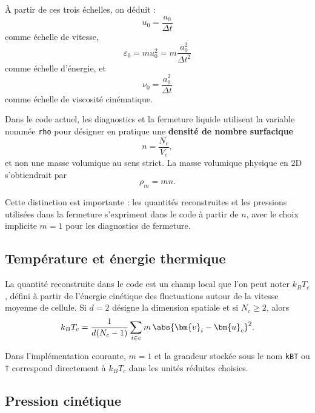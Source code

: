 \documentclass[11pt,a4paper]{article}
\begin{document}
À partir de ces trois échelles, on déduit :
\begin{equation}
 u_0 = \frac{a_0}{\Delta t}
\end{equation}
comme échelle de vitesse,
\begin{equation}
 \varepsilon_0 = m u_0^2 = m\frac{a_0^2}{\Delta t^2}
\end{equation}
comme échelle d'énergie, et
\begin{equation}
 \nu_0 = \frac{a_0^2}{\Delta t}
\end{equation}
comme échelle de viscosité cinématique.

Dans le code actuel, les diagnostics et la fermeture liquide utilisent la variable nommée \verb|rho| pour désigner en pratique une \textbf{densité de nombre surfacique}
\begin{equation}
 n = \frac{N_c}{V_c},
\end{equation}
et non une masse volumique au sens strict. La masse volumique physique en 2D s'obtiendrait par
\begin{equation}
 \rho_m = m n.
\end{equation}

Cette distinction est importante : les quantités reconstruites et les pressions utilisées dans la fermeture s'expriment dans le code à partir de $n$, avec le choix implicite $m=1$ pour les diagnostics de fermeture.

\subsection{Température et énergie thermique}

La quantité reconstruite dans le code est un champ local que l'on peut noter $k_B T_c$, défini à partir de l'énergie cinétique des fluctuations autour de la vitesse moyenne de cellule. Si $d=2$ désigne la dimension spatiale et si $N_c\ge 2$, alors
\begin{equation}
 k_B T_c = \frac{1}{d(N_c-1)} \sum_{i\in c} m\,\abs{\bm{v}_i-\bm{u}_c}^2.
\end{equation}

Dans l'implémentation courante, $m=1$ et la grandeur stockée sous le nom \verb|kBT| ou \verb|T| correspond directement à $k_B T_c$ dans les unités réduites choisies.

\subsection{Pression cinétique}
\end{document}
